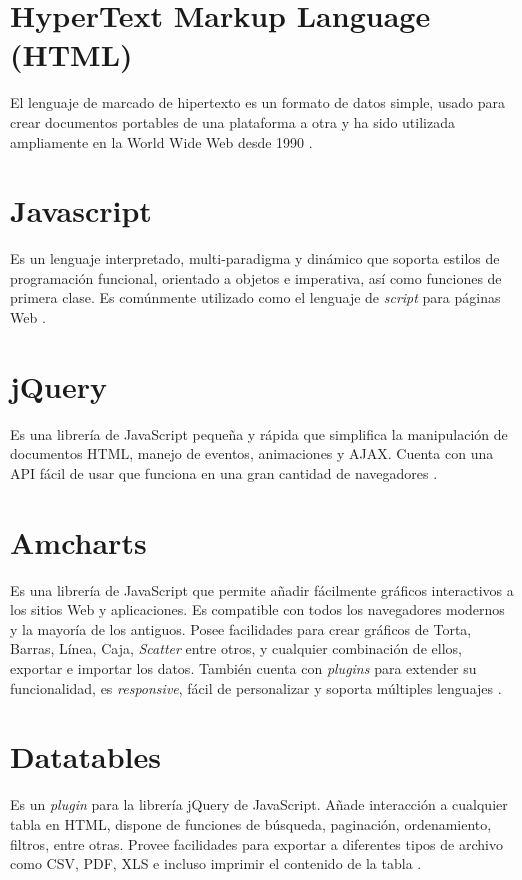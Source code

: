 \section{HyperText Markup Language (HTML)}

El lenguaje de marcado de hipertexto es un formato de datos simple, usado para crear documentos portables de una plataforma a otra y ha sido utilizada ampliamente en la World Wide Web desde 1990 \cite{RFC1866}.

\section{Javascript}

Es un lenguaje interpretado, multi-paradigma y dinámico que soporta estilos de programación funcional,  orientado a objetos e imperativa, así como funciones de primera clase. Es comúnmente utilizado como el lenguaje de \textit{script} para páginas Web \cite{javascript}.

\section{jQuery}

Es una librería de JavaScript pequeña y rápida que simplifica la manipulación de documentos HTML, manejo de eventos, animaciones y AJAX. Cuenta con una API fácil de usar que funciona en una gran cantidad de navegadores \cite{jsonfield}.

\section{Amcharts}

Es una librería de JavaScript que permite añadir fácilmente gráficos
interactivos a los sitios Web y aplicaciones. Es compatible con todos los
navegadores modernos y la mayoría de los antiguos. Posee facilidades para crear
gráficos de Torta, Barras, Línea, Caja, \textit{Scatter} entre otros, y
cualquier combinación de ellos, exportar e importar los datos. También cuenta
con \textit{plugins} para extender su funcionalidad, es \textit{responsive},
fácil de personalizar y soporta múltiples lenguajes \cite{Amcharts}.

\section{Datatables}

Es un \textit{plugin} para la librería jQuery de JavaScript. Añade interacción
a cualquier tabla en HTML, dispone de funciones de búsqueda, paginación,
ordenamiento, filtros, entre otras. Provee facilidades para exportar a
diferentes tipos de archivo como CSV, PDF, XLS e incluso imprimir el contenido
de la tabla \cite{Datatables}.

